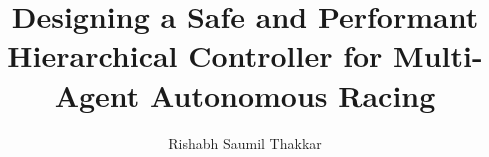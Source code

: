 \documentclass[12pt]{report}
\author{Rishabh Saumil Thakkar}  	%
\title{Designing a Safe and Performant Hierarchical Controller for Multi-Agent Autonomous Racing}
\theoremstyle{definition}
\theoremstyle{remark}
\numberwithin{equation}{section}
\begin{document}
\copyrightpage
\titlepage
\commcertpage
\begin{acknowledgments}	


\end{acknowledgments}


%
\utabstract

\indent



\tableofcontents   %

\listoftables      %
\listoffigures     %


% 






\appendices

\nocite{*}      %
\end{document}
